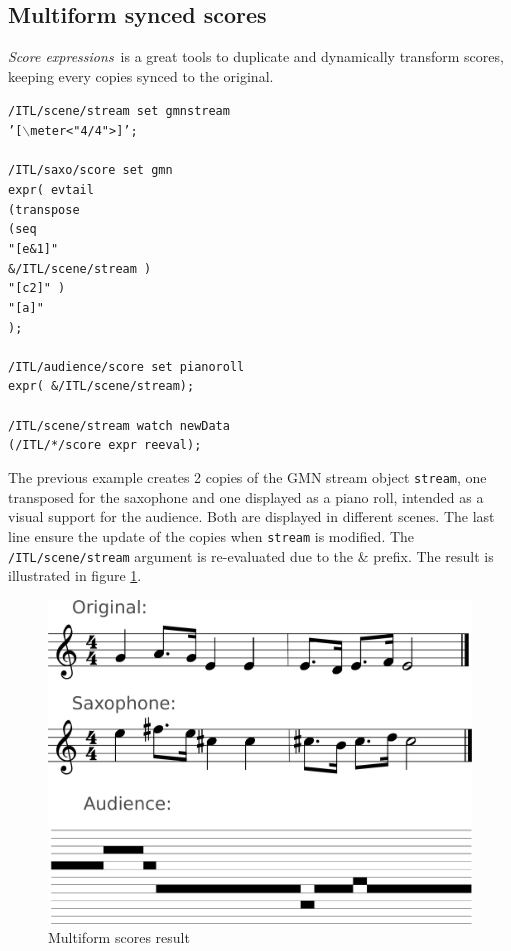 \documentclass{article}
\newcommand{\OSC}[1]{{\fontsize{10pt}{10pt} \selectfont\texttt{#1}}}
\newcommand{\SExpr}{\emph{Score expressions}}
\newcommand{\tab}{\hspace*{4mm}}
\newcommand{\sample}	[1]			{\vspace{-0.2em}\begin{center}\colorbox{mygrey}{\begin{minipage}[t]{0.95\columnwidth} {\small \texttt{#1}}\end{minipage}}\end{center}}
\begin{document}
\subsection{Multiform synced scores}\label{sample2}
\SExpr\ is a great tools to duplicate and dynamically transform scores, keeping every copies synced to the original.

\sample{/ITL/scene/stream set gmnstream \\
\tab '[$\backslash$meter<"4/4">]';\\
\\
/ITL/saxo/score set gmn \\
\tab expr( evtail\\
\tab \tab (transpose\\
\tab \tab \tab (seq\\
\tab \tab \tab \tab "[e\&1]"\\
\tab \tab \tab \tab \&/ITL/scene/stream )\\
\tab \tab \tab "[c2]" )\\
\tab \tab "[a]"\\
\tab );\\
\\
/ITL/audience/score set pianoroll \\
\tab expr( \&/ITL/scene/stream);\\
\\
/ITL/scene/stream watch newData\\
\tab(/ITL/*/score expr reeval);
}

The previous example creates 2 copies of the GMN stream object \OSC{stream}, one transposed for the saxophone and one displayed as a piano roll, intended as a visual support for the audience. Both are displayed in different scenes.
The last line ensure the update of the copies when \OSC{stream} is modified. The \OSC{/ITL/scene/stream} argument is re-evaluated due to the \& prefix. The result is illustrated in figure \ref{fig:mutliscoreFig}.

\begin{figure}[th]
\centering
\includegraphics[width=0.9\columnwidth]{imgs/example1}
\caption{Multiform scores result
\label{fig:mutliscoreFig}}
\end{figure}
\end{document}
